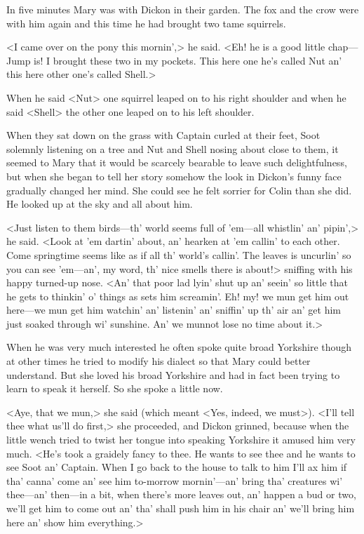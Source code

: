 In five minutes Mary was with Dickon in their garden. The fox and the crow were with him again and this time he had brought two tame squirrels.

<I came over on the pony this mornin',> he said. <Eh! he is a good little chap—Jump is! I brought these two in my pockets. This here one he's called Nut an' this here other one's called Shell.>

When he said <Nut> one squirrel leaped on to his right shoulder and when he said <Shell> the other one leaped on to his left shoulder.

When they sat down on the grass with Captain curled at their feet, Soot solemnly listening on a tree and Nut and Shell nosing about close to them, it seemed to Mary that it would be scarcely bearable to leave such delightfulness, but when she began to tell her story somehow the look in Dickon's funny face gradually changed her mind. She could see he felt sorrier for Colin than she did. He looked up at the sky and all about him.

<Just listen to them birds—th' world seems full of 'em—all whistlin' an' pipin',> he said. <Look at 'em dartin' about, an' hearken at 'em callin' to each other. Come springtime seems like as if all th' world's callin'. The leaves is uncurlin' so you can see 'em—an', my word, th' nice smells there is about!> sniffing with his happy turned-up nose. <An' that poor lad lyin' shut up an' seein' so little that he gets to thinkin' o' things as sets him screamin'. Eh! my! we mun get him out here—we mun get him watchin' an' listenin' an' sniffin' up th' air an' get him just soaked through wi' sunshine. An' we munnot lose no time about it.>

When he was very much interested he often spoke quite broad Yorkshire though at other times he tried to modify his dialect so that Mary could better understand. But she loved his broad Yorkshire and had in fact been trying to learn to speak it herself. So she spoke a little now.

<Aye, that we mun,> she said (which meant <Yes, indeed, we must>). <I'll tell thee what us'll do first,> she proceeded, and Dickon grinned, because when the little wench tried to twist her tongue into speaking Yorkshire it amused him very much. <He's took a graidely fancy to thee. He wants to see thee and he wants to see Soot an' Captain. When I go back to the house to talk to him I'll ax him if tha' canna' come an' see him to-morrow mornin'—an' bring tha' creatures wi' thee—an' then—in a bit, when there's more leaves out, an' happen a bud or two, we'll get him to come out an' tha' shall push him in his chair an' we'll bring him here an' show him everything.>

